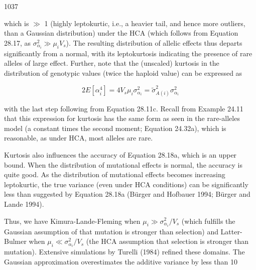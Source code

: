 \documentclass{article}
\begin{document}
1037

which is  $ \gg $ 1 (highly leptokurtic, i.e., a heavier tail, and hence more outliers, than a Gaussian distribution) under the HCA (which follows from Equation 28.17, as  $ \sigma_{\alpha_i}^2 \gg \mu_i V_s $). The resulting distribution of allelic effects thus departs significantly from a normal, with its leptokurtosis indicating the presence of rare alleles of large effect. Further, note that the (unscaled) kurtosis in the distribution of genotypic values (twice the haploid value) can be expressed as

\begin{equation}
2E[\alpha_{i}^{4}]=4V_{s}\mu_{i}\sigma_{\alpha_{i}}^{2}=\widetilde{\sigma}_{A(i)}^{2}\sigma_{\alpha_{i}}^{2}
\tag{28.18d}
\label{eq:28_18d}
\end{equation}

with the last step following from Equation 28.11c. Recall from Example 24.11 that this expression for kurtosis has the same form as seen in the rare-alleles model (a constant times the second moment; Equation 24.32a), which is reasonable, as under HCA, most alleles are rare.

Kurtosis also influences the accuracy of Equation 28.18a, which is an upper bound. When the distribution of mutational effects is normal, the accuracy is quite good. As the distribution of mutational effects becomes increasing leptokurtic, the true variance (even under HCA conditions) can be significantly less than suggested by Equation 28.18a (Bürger and Hofbauer 1994; Bürger and Lande 1994).

Thus, we have Kimura-Lande-Fleming when  $ \mu_i \gg \sigma_{\alpha_i}^2 / V_s $ (which fulfills the Gaussian assumption of that mutation is stronger than selection) and Latter-Bulmer when  $ \mu_i \ll \sigma_{\alpha_i}^2 / V_s $ (the HCA assumption that selection is stronger than mutation). Extensive simulations by Turelli (1984) refined these domains. The Gaussian approximation overestimates the additive variance by less than 10%
\end{document}
